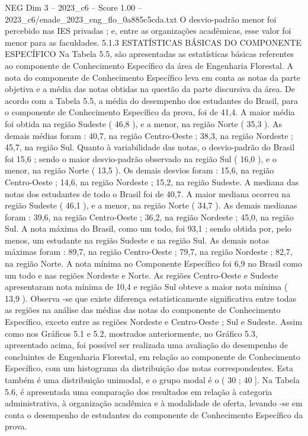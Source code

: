 \begin{textsample}{NEG Dim 3 – 2023\_c6 – Score 1.00 – 2023\_c6/enade\_2023\_eng\_flo\_0a885c5cda.txt}
O desvio-padrão menor foi percebido nas IES privadas ; e, entre as organizações acadêmicas, esse valor foi menor para as faculdades. 5.1.3 ESTATÍSTICAS BÁSICAS DO COMPONENTE ESPECÍFICO Na Tabela 5.5, são apresentadas as estatísticas básicas referentes ao componente de Conhecimento Específico da área de Engenharia Florestal.
A nota do componente de Conhecimento Específico leva em conta as notas da parte objetiva e a média das notas obtidas na questão da parte discursiva da área.
De acordo com a Tabela 5.5, a média do desempenho dos estudantes do Brasil, para o componente de Conhecimento Específico da prova, foi de 41,4.
A maior média foi obtida na região Sudeste ( 46,8 ), e a menor, na região Norte ( 35,3 ).
As demais médias foram : 40,7, na região Centro-Oeste ; 38,3, na região Nordeste ; 45,7, na região Sul.
Quanto à variabilidade das notas, o desvio-padrão do Brasil foi 15,6 ; sendo o maior desvio-padrão observado na região Sul ( 16,0 ), e o menor, na região Norte ( 13,5 ).
Os demais desvios foram : 15,6, na região Centro-Oeste ; 14,6, na região Nordeste ; 15,2, na região Sudeste.
A mediana das notas dos estudantes de todo o Brasil foi de 40,7.
A maior mediana ocorreu na região Sudeste ( 46,1 ), e a menor, na região Norte ( 34,7 ).
As demais medianas foram : 39,6, na região Centro-Oeste ; 36,2, na região Nordeste ; 45,0, na região Sul.
A nota máxima do Brasil, como um todo, foi 93,1 ; sendo obtida por, pelo menos, um estudante na região Sudeste e na região Sul.
As demais notas máximas foram : 89,7, na região Centro-Oeste ; 79,7, na região Nordeste ; 82,7, na região Norte.
A nota mínima no Componente Específico foi 6,9 no Brasil como um todo e nas regiões Nordeste e Norte.
As regiões Centro-Oeste e Sudeste apresentaram nota mínima de 10,4 e região Sul obteve a maior nota mínima ( 13,9 ).
Observa -se que existe diferença estatisticamente significativa entre todas as regiões na análise das médias das notas do componente de Conhecimento Específico, exceto entre as regiões Nordeste e Centro-Oeste ; Sul e Sudeste.
Assim como nos Gráficos 5.1 e 5.2, mostrados anteriormente, no Gráfico 5.3, apresentado acima, foi possível ser realizada uma avaliação do desempenho de concluintes de Engenharia Florestal, em relação ao componente de Conhecimento Específico, com um histograma da distribuição das notas correspondentes.
Esta também é uma distribuição unimodal, e o grupo modal é o ( 30 ; 40 ].
Na Tabela 5.6, é apresentada uma comparação dos resultados em relação à categoria administrativa, à organização acadêmica e à modalidade de oferta, levando -se em conta o desempenho de estudantes do componente de Conhecimento Específico da prova.

\end{textsample}
